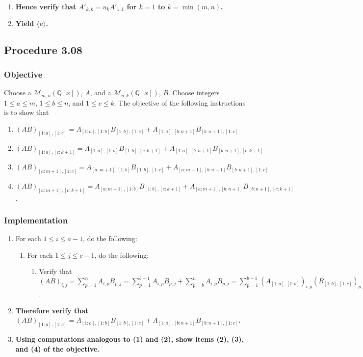 \documentclass[twocolumn]{article}
\newcommand{\procedure}[2][]{\subsection*{Procedure #2 \ifthenelse{\equal{#1}{}}{}{(#1)}}\label{sec:procedure #2}}
\newcommand{\objective}{\subsubsection*{Objective}}
\newcommand{\implementation}{\subsubsection*{Implementation}}
\begin{document}
\begin{enumerate}
\begin{enumerate}
						\begin{enumerate}
							\item Verify that $A'_{k,k}=A_{k,k}=u_kA_{1,1}=u_kA'_{1,1}{{N^{-1}}_*}_{1,1}$.
							\item Set $u_k=u_k{{N^{-1}}_*}_{1,1}$.
							\item Hence verify that $A'_{k,k}=u_kA'_{1,1}$.
						\end{enumerate}
						\item Let $u_j={{N^{-1}}_*}_{1,j}{N_*}_{j,j}$.
						\item Hence verify that $A'_{j,j}=u_jA'_{1,1}$.
						\item Now let $A=A'$.
					\end{enumerate}
					\item \textbf{Hence verify that $A'_{k,k}=u_kA'_{1,1}$ for $k=1$ to $k=\min(m,n)$.}
					\item \textbf{Yield $\langle u\rangle$.}
				\end{enumerate}
		\procedure{3.08}
			\objective
				Choose a $\mathcal{M}_{m,n}(\mathbb{Q}[x])$, $A$, and a $\mathcal{M}_{n,k}(\mathbb{Q}[x])$, $B$. Choose integers $1\le a\le m$, $1\le b\le n$, and $1\le c\le k$. The objective of the following instructions is to show that
				\begin{enumerate}
					\item $(AB)_{[1:a],[1:c]}=A_{[1:a],[1:b]}B_{[1:b],[1:c]}+A_{[1:a],[b:n+1]}B_{[b:n+1],[1:c]}$
					\item $(AB)_{[1:a],[c:k+1]}=A_{[1:a],[1:b]}B_{[1:b],[c:k+1]}+A_{[1:a],[b:n+1]}B_{[b:n+1],[c:k+1]}$
					\item $(AB)_{[a:m+1],[1:c]}=A_{[a:m+1],[1:b]}B_{[1:b],[1:c]}+A_{[a:m+1],[b:n+1]}B_{[b:n+1],[1:c]}$
					\item $(AB)_{[a:m+1],[c:k+1]}=A_{[a:m+1],[1:b]}B_{[1:b],[c:k+1]}+A_{[a:m+1],[b:n+1]}B_{[b:n+1],[c:k+1]}$.
				\end{enumerate}
			\implementation
				\begin{enumerate}
					\item For each $1\le i\le a-1$, do the following:
					\begin{enumerate}
						\item For each $1\le j\le c-1$, do the following:
							\begin{enumerate}
								\item Verify that $(AB)_{i,j}=\sum_{p=1}^n A_{i,p}B_{p,j}=\sum_{p=1}^{b-1} A_{i,p}B_{p,j}+\sum_{p=b}^n A_{i,p}B_{p,j}=\sum_{p=1}^{b-1} (A_{[1:a],[1:b]})_{i,p}(B_{[1:b],[1:c]})_{p,j}+\sum_{p=1}^{1+n-b} (A_{[1:a],[b:n+1]})_{i,p}(B_{[b:n+1],[1:c]})_{p,j}=(A_{[1:a],[1:b]}B_{[1:b],[1:c]})_{i,j}+(A_{[1:a],[b:n+1]}B_{[b:n+1],[1:c]})_{i,j}$.
							\end{enumerate}
					\end{enumerate}
					\item \textbf{Therefore verify that $(AB)_{[1:a],[1:c]}=A_{[1:a],[1:b]}B_{[1:b],[1:c]}+A_{[1:a],[b:n+1]}B_{[b:n+1],[1:c]}$.}
					\item \textbf{Using computations analogous to (1) and (2), show items (2), (3), and (4) of the objective.}
				\end{enumerate}
\end{document}
